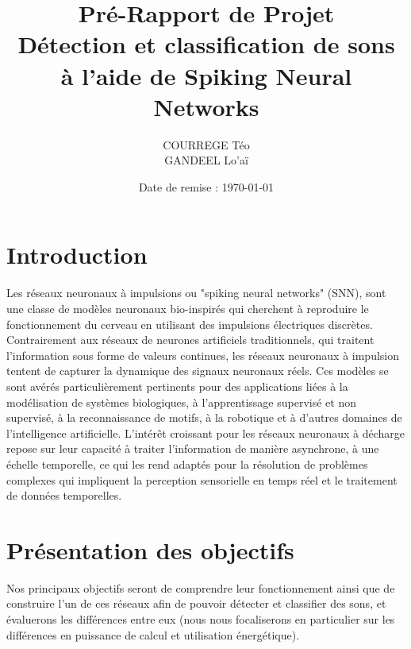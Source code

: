 \documentclass{article}
\title{
    \vspace{2cm}
    \textbf{\Huge Pré-Rapport de Projet}\\
    \vspace{1cm}
    \Large Détection et classification de sons\\à l'aide de Spiking Neural Networks
    \vspace{2cm}
}
\author{
    COURREGE Téo\\
    GANDEEL Lo'aï\\}
\date{\vspace{2cm}\Large Date de remise : \today}
\begin{document}
\maketitle

\pagebreak

\section{Introduction}
Les réseaux neuronaux à impulsions ou "spiking neural networks" (SNN), sont une classe de modèles neuronaux bio-inspirés qui cherchent à reproduire le fonctionnement du cerveau en utilisant des impulsions électriques discrètes. Contrairement aux réseaux de neurones artificiels traditionnels, qui traitent l'information sous forme de valeurs continues, les réseaux neuronaux à impulsion tentent de capturer la dynamique des signaux neuronaux réels. Ces modèles se sont avérés particulièrement pertinents pour des applications liées à la modélisation de systèmes biologiques, à l'apprentissage supervisé et non supervisé, à la reconnaissance de motifs, à la robotique et à d'autres domaines de l'intelligence artificielle. L'intérêt croissant pour les réseaux neuronaux à décharge repose sur leur capacité à traiter l'information de manière asynchrone, à une échelle temporelle, ce qui les rend adaptés pour la résolution de problèmes complexes qui impliquent la perception sensorielle en temps réel et le traitement de données temporelles.

\section{Présentation des objectifs}
Nos principaux objectifs seront de comprendre leur fonctionnement ainsi que de construire l'un de ces réseaux afin de pouvoir détecter et classifier des sons, et évaluerons les différences entre eux (nous nous focaliserons en particulier sur les différences en puissance de calcul et utilisation énergétique).
\end{document}
